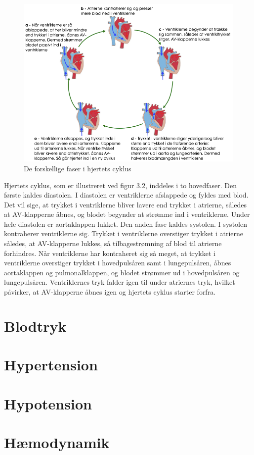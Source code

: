 \begin{figure}[htb]
	\centering
	\includegraphics[width=1\textwidth]{Figurer/Fysio/Cyklus}
	\caption{De forskellige faser i hjertets cyklus \protect\footnotemark}
\end{figure}

Hjertets cyklus, som er illustreret ved figur 3.2, inddeles i to hovedfaser. Den første kaldes diastolen. I diastolen er ventriklerne afslappede og fyldes med blod. Det vil sige, at trykket i ventriklerne bliver lavere end trykket i atrierne, således at AV-klapperne åbnes, og blodet begynder at strømme ind i ventriklerne. Under hele diastolen er aortaklappen lukket. Den anden fase kaldes systolen. I systolen kontraherer ventriklerne sig. Trykket i ventriklerne overstiger trykket i atrierne således, at AV-klapperne lukkes, så tilbagestrømning af blod til atrierne forhindres. Når ventriklerne har kontraheret sig så meget, at trykket i ventriklerne overstiger trykket i hovedpulsåren samt i lungepulsåren, åbnes aortaklappen og pulmonalklappen, og blodet strømmer ud i hovedpulsåren og lungepulsåren. Ventriklernes tryk falder igen til under atriernes tryk, hvilket påvirker, at AV-klapperne åbnes igen og hjertets cyklus starter forfra.\\
\section{Blodtryk}
\section{Hypertension}
\section{Hypotension}
\section{Hæmodynamik}


